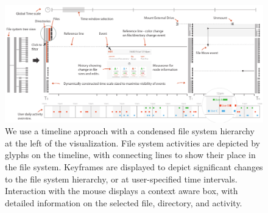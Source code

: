 \begin{figure}[t!]
\begin{center}
\includegraphics[width=\textwidth]{images/filesystem/system_overview}
\end{center}
\caption{We use a timeline approach with a condensed file system hierarchy at the left of the visualization.
File system activities are depicted by glyphs on the timeline, with connecting lines to show their place in the file system.
Keyframes are displayed to depict significant changes to the file system hierarchy, or at user-specified time intervals.
Interaction with the mouse displays a context aware box, with detailed information on the selected file, directory, and activity.}
\label{fig:system}
\end{figure}

